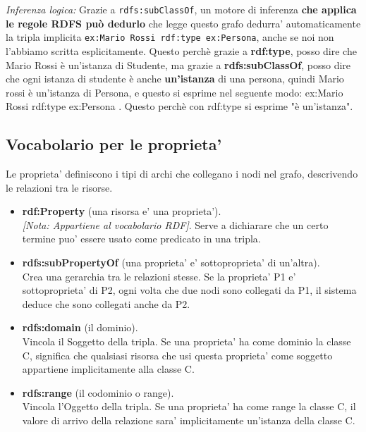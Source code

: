 \noindent
\textit{Inferenza logica:} Grazie a \texttt{rdfs:subClassOf}, un motore di inferenza \textbf{che applica le regole RDFS può dedurlo} che legge questo grafo dedurra' automaticamente la tripla implicita \texttt{ex:Mario Rossi rdf:type ex:Persona}, anche se noi non l'abbiamo scritta esplicitamente.
Questo perchè grazie a \textbf{rdf:type}, posso dire che Mario Rossi è un'istanza di Studente, ma grazie a \textbf{rdfs:subClassOf}, posso dire che 
ogni istanza di studente è anche \textbf{un'istanza} di una persona, quindi Mario rossi è un'istanza di Persona, e questo si esprime nel seguente modo:
ex:Mario Rossi rdf:type ex:Persona . Questo perchè con rdf:type si esprime "è un'istanza".



\subsection{Vocabolario per le proprieta'}
Le proprieta' definiscono i tipi di archi che collegano i nodi nel grafo, descrivendo le relazioni tra le risorse.

\begin{itemize}
    \item \textbf{rdf:Property} (una risorsa e' una proprieta'). \\
    \textit{[Nota: Appartiene al vocabolario RDF]}. Serve a dichiarare che un certo termine puo' essere usato come predicato in una tripla.
    
    \item \textbf{rdfs:subPropertyOf} (una proprieta' e' sottoproprieta' di un'altra). \\
    Crea una gerarchia tra le relazioni stesse. Se la proprieta' P1 e' sottoproprieta' di P2, ogni volta che due nodi sono collegati da P1, il sistema deduce che sono collegati anche da P2.
    
    \item \textbf{rdfs:domain} (il dominio). \\
    Vincola il Soggetto della tripla. Se una proprieta' ha come dominio la classe C, significa che qualsiasi risorsa che usi questa proprieta' come soggetto appartiene implicitamente alla classe C.
    
    \item \textbf{rdfs:range} (il codominio o range). \\
    Vincola l'Oggetto della tripla. Se una proprieta' ha come range la classe C, il valore di arrivo della relazione sara' implicitamente un'istanza della classe C.
\end{itemize}

